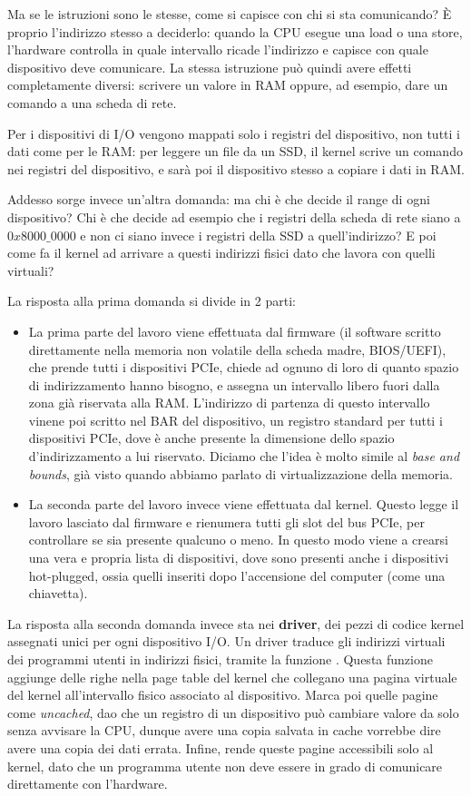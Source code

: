 \documentclass[11pt, a4paper, titlepage, oneside]{scrbook}
\begin{document}
Ma se le istruzioni sono le stesse, come si capisce con chi si sta comunicando? È proprio l'indirizzo stesso a deciderlo: quando la CPU esegue una load o una store, l'hardware controlla in quale intervallo ricade l'indirizzo e capisce con quale dispositivo deve comunicare. La stessa istruzione può quindi avere effetti completamente diversi: scrivere un valore in RAM oppure, ad esempio, dare un comando a una scheda di rete. 

\NB Per i dispositivi di I/O vengono mappati solo i registri del dispositivo, non tutti i dati come per le RAM: per leggere un file da un SSD, il kernel scrive un comando nei registri del dispositivo, e sarà poi il dispositivo stesso a copiare i dati in RAM. 

Addesso sorge invece un'altra domanda: ma chi è che decide il range di ogni dispositivo? Chi è che decide ad esempio che i registri della scheda di rete siano a $0x8000\_0000$ e non ci siano invece i registri della SSD a quell'indirizzo? E poi come fa il kernel ad arrivare a questi indirizzi fisici dato che lavora con quelli virtuali? 

La risposta alla prima domanda si divide in 2 parti:
\begin{itemize}
    \item La prima parte del lavoro viene effettuata dal firmware (il software scritto direttamente nella memoria non volatile della scheda madre, BIOS/UEFI), che prende tutti i dispositivi PCIe, chiede ad ognuno di loro di quanto spazio di indirizzamento hanno bisogno, e assegna un intervallo libero fuori dalla zona già riservata alla RAM. L'indirizzo di partenza di questo intervallo vinene poi scritto nel BAR del dispositivo, un registro standard per tutti i dispositivi PCIe, dove è anche presente la dimensione dello spazio d'indirizzamento a lui riservato. Diciamo che l'idea è molto simile al \textit{base and bounds}, già visto quando abbiamo parlato di virtualizzazione della memoria.
    \item La seconda parte del lavoro invece viene effettuata dal kernel. Questo legge il lavoro lasciato dal firmware e rienumera tutti gli slot del bus PCIe, per controllare se sia presente qualcuno o meno. In questo modo viene a crearsi una vera e propria lista di dispositivi, dove sono presenti anche i dispositivi hot-plugged, ossia quelli inseriti dopo l'accensione del computer (come una chiavetta).
\end{itemize}

La risposta alla seconda domanda invece sta nei \textbf{driver}, dei pezzi di codice kernel assegnati unici per ogni dispositivo I/O. Un driver traduce gli indirizzi virtuali dei programmi utenti in indirizzi fisici, tramite la funzione . Questa funzione aggiunge delle righe nella page table del kernel che collegano una pagina virtuale del kernel all'intervallo fisico associato al dispositivo. Marca poi quelle pagine come \textit{uncached}, dao che un registro di un dispositivo può cambiare valore da solo senza avvisare la CPU, dunque avere una copia salvata in cache vorrebbe dire avere una copia dei dati errata. Infine, rende queste pagine accessibili solo al kernel, dato che un programma utente non deve essere in grado di comunicare direttamente con l'hardware.
\end{document}
